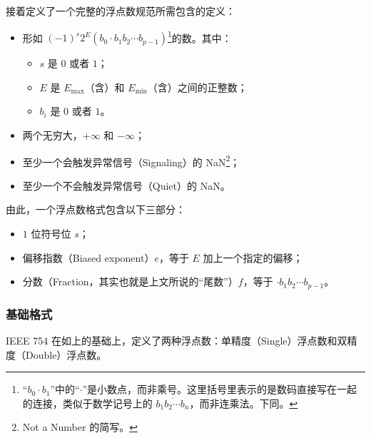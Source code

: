             接着定义了一个完整的浮点数规范所需包含的定义：
            \begin{itemize}
                \item 形如 $(-1)^s2^E(b_0 \cdot b_1b_2 \cdots b_{p-1})$\footnote{“$b_0 \cdot b_1$”中的“$\cdot$”是小数点，而非乘号。这里括号里表示的是数码直接写在一起的连接，类似于数学记号上的 $\overline{b_1b_2 \cdots b_n}$，而非连乘法。下同。}的数。其中：
                    \begin{itemize}
                        \item $s$ 是 $0$ 或者 $1$；
                        \item $E$ 是 $E_{\max}$（含）和 $E_{\min}$（含）之间的正整数；
                        \item $b_i$ 是 $0$ 或者 $1$。
                    \end{itemize}
                \item 两个无穷大，$+\infty$ 和 $-\infty$；
                \item 至少一个会触发异常信号（Signaling）的 NaN\footnote{Not a Number 的简写。}；
                \item 至少一个不会触发异常信号（Quiet）的 NaN。
            \end{itemize}

            由此，一个浮点数格式包含以下三部分：
            \begin{itemize}
                \item $1$ 位符号位 $s$；
                \item 偏移指数（Biased exponent）$e$，等于 $E$ 加上一个指定的偏移；
                \item 分数（Fraction，其实也就是上文所说的“尾数”）$f$，等于 $\cdot b_1b_2 \cdots b_{p-1}$。
            \end{itemize}
        \subsubsection{基础格式}\label{subsubsec:NumberSystemBasics/FloatingPointNotations/IEEE754/BasicFormats}
            IEEE 754 在如上的基础上，定义了两种浮点数：单精度（Single）浮点数和双精度（Double）浮点数。

